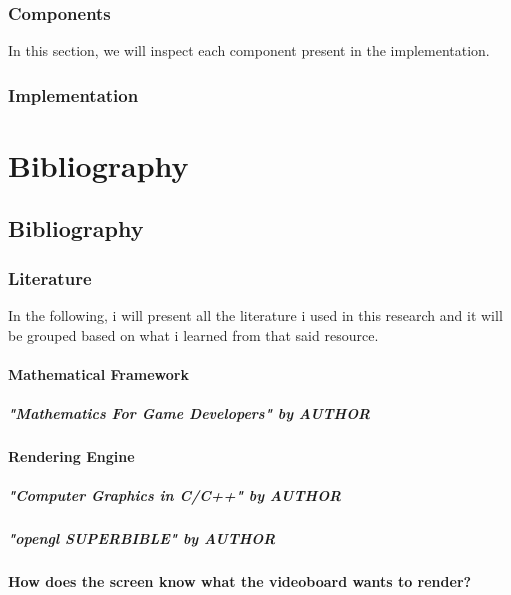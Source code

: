 \documentclass[12pt]{report}
\begin{document}
        \section*{Components}
          In this section, we will inspect each component present in the implementation.
          
          
          
          
        \section*{Implementation}
          

    \part{Bibliography}
      \chapter*{Bibliography}

        \section*{Literature}
          In the following, i will present all the literature i used in this research and it will be grouped based on what i learned from that said resource.

          \subsection*{Mathematical Framework}
            \subsubsection*{"Mathematics For Game Developers" by AUTHOR}
              
          \subsection*{Rendering Engine}
            \subsubsection*{"Computer Graphics in C/C++" by AUTHOR}
              
            \subsubsection*{"opengl SUPERBIBLE" by AUTHOR}
              
              \textbf{How does the screen know what the videoboard wants to render?}
                
\end{document}
